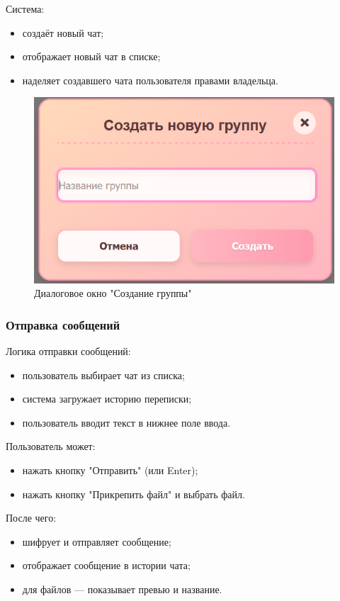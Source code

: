 Система:

\begin{itemize}		
\item создаёт новый чат;  
\item отображает новый чат в списке;
\item наделяет создавшего чата пользователя правами владельца.
\end{itemize}

\begin{figure}[!h]
	\centering
	\includegraphics[width=0.8\linewidth]{"images/Окно создания группы"}
	\caption{Диалоговое окно "Создание группы"}
	\label{fig:create-group}
\end{figure}

\subsubsection{Отправка сообщений}  
Логика отправки сообщений:  
\begin{itemize}  
	\item пользователь выбирает чат из списка;  
	\item система загружает историю переписки;  
	\item пользователь вводит текст в нижнее поле ввода.
\end{itemize}

Пользователь может:

\begin{itemize}
		\item нажать кнопку "Отправить" (или Enter);  
		\item нажать кнопку "Прикрепить файл" и выбрать файл.
\end{itemize}

После чего:

\begin{itemize}
		\item шифрует и отправляет сообщение;  
		\item отображает сообщение в истории чата;  
		\item для файлов — показывает превью и название.   
\end{itemize}  

